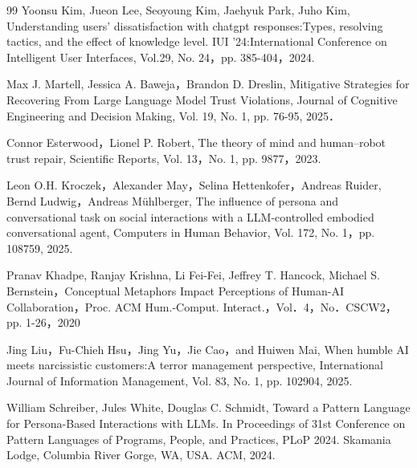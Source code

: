 \documentclass[10pt,twocolumn]{jsarticle}
\begin{document}
\footnotesize
\begin{thebibliography}{99}
\vspace{1zh}
Yoonsu Kim, Jueon Lee, Seoyoung Kim, Jaehyuk Park, Juho Kim, Understanding users’ dissatisfaction with
chatgpt responses:Types, resolving tactics, and the effect of knowledge level. IUI '24:International Conference on Intelligent User Interfaces, Vol.29, No. 24，pp. 385-404，2024.

Max J. Martell, Jessica A. Baweja，Brandon D. Dreslin, Mitigative Strategies for Recovering From Large Language Model Trust Violations, Journal of Cognitive Engineering and Decision Making, Vol. 19, No. 1, pp. 76-95, 2025．

Connor Esterwood，Lionel P. Robert, The theory of mind and human–robot trust repair, Scientific Reports, Vol. 13，No. 1, pp. 9877，2023.

 Leon O.H. Kroczek，Alexander May，Selina Hettenkofer，Andreas Ruider, Bernd Ludwig，Andreas Mühlberger, The influence of persona and conversational task on social interactions with a LLM-controlled embodied conversational agent,  Computers in Human Behavior, Vol. 172, No. 1，pp. 108759, 2025.

Pranav Khadpe, Ranjay Krishna, Li Fei-Fei, Jeffrey T. Hancock, Michael S. Bernstein，Conceptual Metaphors Impact Perceptions of Human-AI Collaboration，Proc. ACM Hum.-Comput. Interact.，Vol．4，No．CSCW2，pp. 1-26，2020


 Jing Liu，Fu-Chieh Hsu，Jing Yu，Jie Cao，and Huiwen Mai, When humble AI meets narcissistic customers:A terror management perspective, International Journal of Information Management, Vol. 83, No. 1, pp. 102904, 2025. 

William Schreiber, Jules White, Douglas C. Schmidt, Toward a Pattern Language for Persona-Based Interactions with LLMs. In Proceedings of 31st Conference on Pattern Languages of Programs, People, and Practices, PLoP 2024. Skamania Lodge, Columbia River Gorge, WA, USA. ACM, 2024. 


\end{thebibliography}
\end{document}
